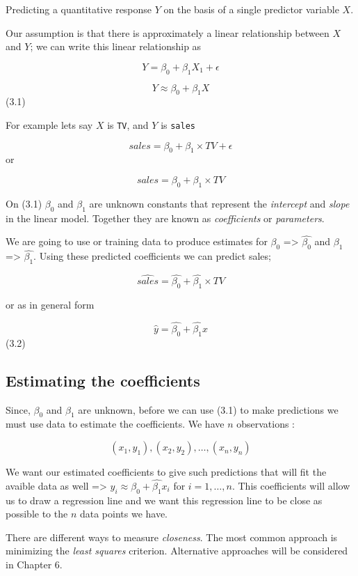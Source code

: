 \documentclass[
  letterpaper,
  DIV=11,
  numbers=noendperiod]{scrreprt}
\begin{document}
Predicting a quantitative response \(Y\) on the basis of a single
predictor variable \(X\).

Our assumption is that there is approximately a linear relationship
between \(X\) and \(Y\); we can write this linear relationship as

\[
Y = \beta_0 + \beta_1 X_1 + \epsilon
\]

\[
Y \approx \beta_0 + \beta_1X
\] (3.1)

For example lets say \(X\) is \texttt{TV}, and \(Y\) is \texttt{sales}

\[
sales = \beta_0 + \beta_1 \times TV + \epsilon
\] or

\[
sales = \beta_0 + \beta_1 \times TV
\]

On (3.1) \(\beta_0\) and \(\beta_1\) are unknown constants that
represent the \emph{intercept} and \emph{slope} in the linear model.
Together they are known as \emph{coefficients} or \emph{parameters}.

We are going to use or training data to produce estimates for
\(\beta_0\) =\textgreater{} \(\hat{\beta_0}\) and \(\beta_1\)
=\textgreater{} \(\hat{\beta_1}\). Using these predicted coefficients we
can predict sales;

\[
\hat{sales} = \hat{\beta_0} + \hat{\beta_1} \times TV
\]

or as in general form

\[
\hat{y} = \hat{\beta_0} + \hat{\beta_1}x
\] (3.2)

\hypertarget{estimating-the-coefficients}{%
\subsection{Estimating the
coefficients}\label{estimating-the-coefficients}}

Since, \(\beta_0\) and \(\beta_1\) are unknown, before we can use (3.1)
to make predictions we must use data to estimate the coefficients. We
have \(n\) observations :

\[
(x_1,y_1), (x_2,y_2), \dots, (x_n,y_n)
\]

We want our estimated coefficients to give such predictions that will
fit the avaible data as well =\textgreater{}
\(y_i \approx \hat{\beta_0} + \hat{\beta_1}x_i\) for \(i = 1,\dots, n\).
This coefficients will allow us to draw a regression line and we want
this regression line to be close as possible to the \(n\) data points we
have.

There are different ways to measure \emph{closeness}. The most common
approach is minimizing the \emph{least squares} criterion. Alternative
approaches will be considered in Chapter 6.
\end{document}
